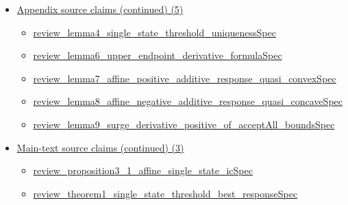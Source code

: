 \documentclass[10pt]{article}
\begin{document}
\begin{itemize}[leftmargin=1.2em]
\begin{itemize}[leftmargin=1.2em]
\item \hyperlink{source-claim-dbe4c990fc185239}{review\_\allowbreak{}lemma2\_\allowbreak{}switch\_\allowbreak{}probability\_\allowbreak{}formula\allowbreak{}Spec}
\item \hyperlink{source-claim-ebc105656e6d5688}{review\_\allowbreak{}lemma3\_\allowbreak{}measured\_\allowbreak{}time\_\allowbreak{}fraction\_\allowbreak{}formula\allowbreak{}Spec}
\end{itemize}
\item \hyperlink{source-section-2ccaa156c5fe17ad}{Appendix source claims (continued) (5)}
\begin{itemize}[leftmargin=1.2em]
\item \hyperlink{source-claim-62d2ac601494c757}{review\_\allowbreak{}lemma4\_\allowbreak{}single\_\allowbreak{}state\_\allowbreak{}threshold\_\allowbreak{}uniqueness\allowbreak{}Spec}
\item \hyperlink{source-claim-de2ea96cec45a85c}{review\_\allowbreak{}lemma6\_\allowbreak{}upper\_\allowbreak{}endpoint\_\allowbreak{}derivative\_\allowbreak{}formula\allowbreak{}Spec}
\item \hyperlink{source-claim-414ba26e7a98cabd}{review\_\allowbreak{}lemma7\_\allowbreak{}affine\_\allowbreak{}positive\_\allowbreak{}additive\_\allowbreak{}response\_\allowbreak{}quasi\_\allowbreak{}convex\allowbreak{}Spec}
\item \hyperlink{source-claim-72681991e4ec9e7d}{review\_\allowbreak{}lemma8\_\allowbreak{}affine\_\allowbreak{}negative\_\allowbreak{}additive\_\allowbreak{}response\_\allowbreak{}quasi\_\allowbreak{}concave\allowbreak{}Spec}
\item \hyperlink{source-claim-7d5af65772b5a76a}{review\_\allowbreak{}lemma9\_\allowbreak{}surge\_\allowbreak{}derivative\_\allowbreak{}positive\_\allowbreak{}of\_\allowbreak{}accept\allowbreak{}All\_\allowbreak{}bounds\allowbreak{}Spec}
\end{itemize}
\item \hyperlink{source-section-c08c7eca66416a2f}{Main-text source claims (continued) (3)}
\begin{itemize}[leftmargin=1.2em]
\item \hyperlink{source-claim-a66252366d7621fe}{review\_\allowbreak{}proposition3\_\allowbreak{}1\_\allowbreak{}affine\_\allowbreak{}single\_\allowbreak{}state\_\allowbreak{}ic\allowbreak{}Spec}
\item \hyperlink{source-claim-cdbb75fcd67baff3}{review\_\allowbreak{}theorem1\_\allowbreak{}single\_\allowbreak{}state\_\allowbreak{}threshold\_\allowbreak{}best\_\allowbreak{}response\allowbreak{}Spec}

\end{itemize}
\end{itemize}
\end{document}
